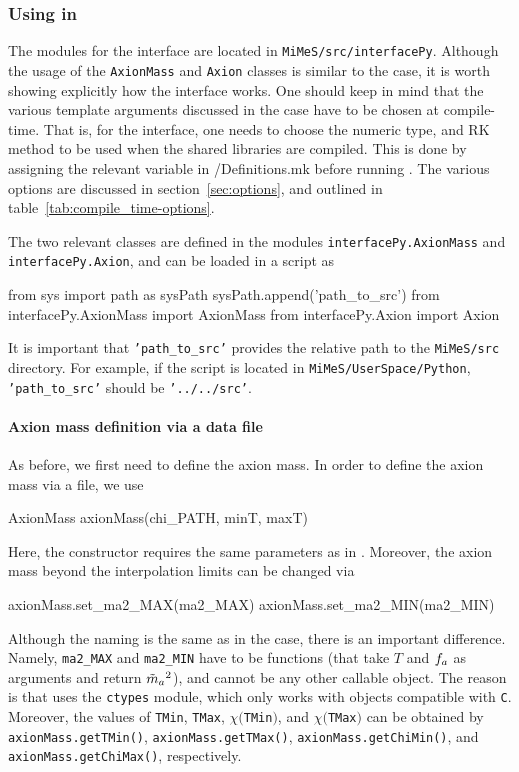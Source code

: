 \documentclass[11pt,a4paper]{article}
\begin{document}
\subsubsection{Using \mimes in \PY}\label{sec:begin_py}
%
The modules for the \PY interface are located in {\tt MiMeS/src/interfacePy}. Although the usage of the {\tt AxionMass} and {\tt Axion} classes is similar to the \CPP case, it is worth showing explicitly how the \PY interface works. One should keep in mind that the various template arguments discussed in the \CPP case have to be chosen at compile-time. That is, for the \PY interface, one needs to choose the numeric type, and RK method to be used when the shared libraries are compiled. This is done by assigning the relevant variable in {\mimes/Definitions.mk} before running . The various options are discussed in section~\ref{sec:options}, and outlined in table~\ref{tab:compile_time-options}.

 
The two relevant classes are defined in the modules {\tt interfacePy.AxionMass} and {\tt interfacePy.Axion}, and can be loaded in a \PY script as 
%
\begin{py}
	from sys import path as sysPath
	sysPath.append('path_to_src')
	from interfacePy.AxionMass import AxionMass
	from interfacePy.Axion import Axion
\end{py}
%
It is important that {\tt 'path\_to\_src'} provides the relative path to the {\tt MiMeS/src} directory. For example, if the script is located in {\tt MiMeS/UserSpace/Python}, {\tt 'path\_to\_src'} should be {\tt '../../src'}.

\paragraph{Axion mass definition via a data file}
As before, we first need to define the axion mass. In order to define the axion mass via a file, we use
%
\begin{py}
	AxionMass axionMass(chi_PATH, minT, maxT)
\end{py}
%
Here, the constructor requires the same parameters as in \CPP. Moreover, the axion mass beyond the interpolation limits can be changed via
%
\begin{py}
	axionMass.set_ma2_MAX(ma2_MAX)
	axionMass.set_ma2_MIN(ma2_MIN)
\end{py}
%
Although the naming is the same as in the \CPP case, there is an important difference. Namely, {\tt ma2\_MAX} and {\tt ma2\_MIN} have to be functions (that take $T$ and $f_{a}{}$ as arguments and return $\tilde m_{a}{}^2$), and cannot be any other callable object. The reason is that \mimes uses the {\tt ctypes} module, which only works with objects compatible with {\tt C}. 
%
Moreover, the values of {\tt TMin}, {\tt TMax}, $\chi(${\tt TMin}$)$, and $\chi(${\tt TMax}$)$ can be obtained by {\tt axionMass.getTMin()}, {\tt axionMass.getTMax()}, {\tt axionMass.getChiMin()}, and {\tt axionMass.getChiMax()}, respectively.
\end{document}
